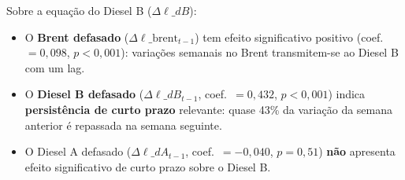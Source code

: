 \documentclass[12pt,a4paper]{article}
\begin{document}
\begin{table}[H]
\centering
\caption{Coeficientes do VECM --- Equação Completa por Variável}
\label{tab:gamma}
\end{table}

\noindent
Sobre a equação do Diesel B ($\Delta\ell\_dB$):
\begin{itemize}
  \item O \textbf{Brent defasado} ($\Delta\ell\_\text{brent}_{t-1}$) tem efeito
        significativo positivo (coef.\ $= 0{,}098$, $p < 0{,}001$): variações
        semanais no Brent transmitem-se ao Diesel B com um lag.
  \item O \textbf{Diesel B defasado} ($\Delta\ell\_dB_{t-1}$, coef.\ $= 0{,}432$,
        $p < 0{,}001$) indica \textbf{persistência de curto prazo} relevante:
        quase 43\% da variação da semana anterior é repassada na semana seguinte.
  \item O Diesel A defasado ($\Delta\ell\_dA_{t-1}$, coef.\ $= -0{,}040$, $p = 0{,}51$)
        \textbf{não} apresenta efeito significativo de curto prazo sobre o Diesel B.
\end{itemize}
\end{document}
